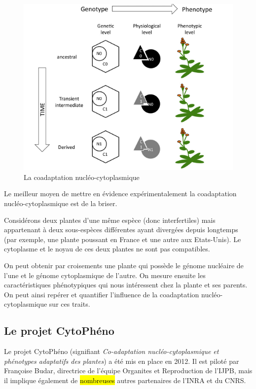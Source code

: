 \documentclass[a4paper]{article}
\newcommand{\rewrite}[1]{\todo[color=green!40]{#1}}
\newcommand{\hlrewrite}[2]{\sethlcolor{green} \hl{#1} \rewrite{#2}}
\begin{document}
\begin{figure}[!ht]
\centering
\includegraphics[scale=0.8]{Introduction/coadaptation.PNG}
\caption{La coadaptation nucléo-cytoplasmique \cite{marechal2012mitochondrial}}
\label{coadaptation}
\end{figure}

Le meilleur moyen de mettre en évidence expérimentalement la coadaptation nucléo-cytoplasmique est de la briser.

Considérons deux plantes d'une même espèce (donc interfertiles) mais appartenant à deux sous-espèces différentes ayant divergées depuis longtemps (par exemple, une plante poussant en France et une autre aux Etats-Unis). Le cytoplasme et le noyau de ces deux plantes ne sont pas compatibles. 

On peut obtenir par croisements une plante qui possède le génome nucléaire de l'une et le génome cytoplasmique de l'autre. On mesure ensuite les caractéristiques phénotypiques qui nous intéressent chez la plante et ses parents. On peut ainsi repérer et quantifier l'influence de la coadaptation nucléo-cytoplasmique sur ces traits. 

\subsection{Le projet CytoPhéno}

Le projet CytoPhéno (signifiant \textit{Co-adaptation nucléo-cytoplasmique et phénotypes adaptatifs des plantes}) a été mis en place en 2012. Il est piloté par Françoise Budar, directrice de l'équipe Organites et Reproduction de l'IJPB, mais il implique également de \hlrewrite{nombreuses}{nombreux} autres partenaires de l'INRA et du CNRS. 
\end{document}
